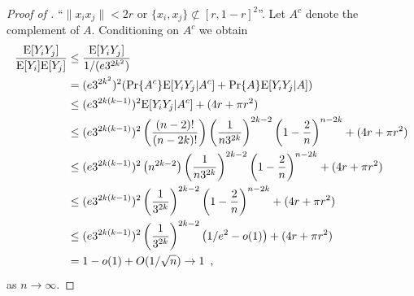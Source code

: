 \documentclass{patmorin}
\begin{document}
\begin{proof}[Proof of ]
``$\|x_ix_j\| < 2r$ or $\{x_i,x_j\}\not\subset[r,1-r]^2$''.  Let $A^c$
denote the complement of $A$.  Conditioning on $A^c$ we obtain
\begin{align*}
\frac{\mathrm{E}[Y_iY_j]}{\mathrm{E}[Y_i]\mathrm{E}[Y_j]} 
& \le \frac{\mathrm{E}[Y_iY_j]}{1/(e3^{2k^2})} \\
& = (e3^{2k^2})^2(\Pr\{A^c\}\mathrm{E}[Y_iY_j|A^c] + \Pr\{A\}\mathrm{E}[Y_iY_j|A]) \\
& \le (e3^{2k(k-1)})^2\mathrm{E}[Y_iY_j|A^c]  + (4r+\pi r^2) \\
& \le (e3^{2k(k-1)})^2 
    \left(\frac{(n-2)!}{(n-2k)!}\right)
    \left(\frac{1}{n3^{2k}}\right)^{2k-2}
    \left(1-\frac{2}{n}\right)^{n-2k} + (4r+\pi r^2) \\
& \le (e3^{2k(k-1)})^2
    \left(n^{2k-2}\right)
    \left(\frac{1}{n3^{2k}}\right)^{2k-2}
    \left(1-\frac{2}{n}\right)^{n-2k} + (4r+\pi r^2) \\
& \le (e3^{2k(k-1)})^2
    \left(\frac{1}{3^{2k}}\right)^{2k-2}
    \left(1-\frac{2}{n}\right)^{n-2k} + (4r+\pi r^2) \\
& \le (e3^{2k(k-1)})^2
    \left(\frac{1}{3^{2k}}\right)^{2k-2}
    \left(1/e^2-o(1)\right) + (4r+\pi r^2) \\
& = 1-o(1) + O(1/\sqrt{n}) \rightarrow 1 \enspace ,
\end{align*}
as $n\rightarrow\infty$.
\end{proof}
\end{document}

